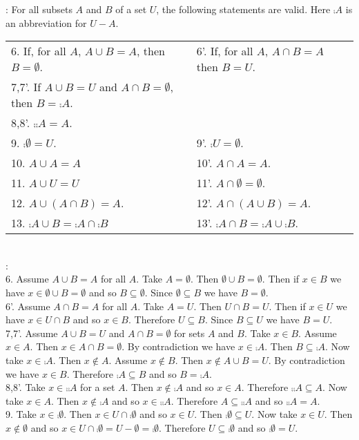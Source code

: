\documentclass[12pt]{book}
\begin{document}
: For all subsets $A$ and $B$ of a set $U$, the following statements are valid. Here $\comp{A}$ is an abbreviation for $U - A$.\\
\begin{tabular}{ll}
6. If, for all $A$, $A \cup B = A$, then $B = \emptyset$.& 6'. If, for all $A$, $A \cap B = A$ then $B = U$.\\
7,7'. If $A \cup B = U$ and $A \cap B = \emptyset$, then $B = \comp{A}$.\\
8,8'. $\comp{\comp{A}} = A$.\\
9. $\comp{\emptyset} = U$.& 9'. $\comp{U} = \emptyset$.\\
10. $A \cup A = A$& 10'. $A \cap A = A$.\\
11. $A \cup U = U$& 11'. $A \cap \emptyset = \emptyset$.\\
12. $A \cup (A \cap B) = A$. &12'. $A \cap (A \cup B) = A$.\\
13. $\comp{A \cup B} = \comp{A} \cap \comp{B}$& 13'. $\comp{A \cap B} = \comp{A} \cup \comp{B}$.
\end{tabular}\\
:\\
6. Assume $A \cup B = A$ for all $A$. Take $A = \emptyset$. Then $\emptyset \cup B = \emptyset$. Then if $x \in B$ we have $x \in \emptyset \cup B = \emptyset$ and so $B \subseteq \emptyset$. Since $\emptyset \subseteq B$ we have $B = \emptyset$.\\
6'. Assume $A \cap B = A$ for all $A$. Take $A = U$. Then $U \cap B = U$. Then if $x \in U$ we have $x \in U \cap B$ and so $x \in B$. Therefore $U \subseteq B$. Since $B \subseteq U$ we have $B = U$.\\
7,7'. Assume $A \cup  B = U$ and $A \cap B = \emptyset$ for sets $A$ and $B$. Take $x \in B$. Assume $x \in A$. Then $x \in A \cap B = \emptyset$. By contradiction we have $x \in \comp{A}$. Then $B \subseteq \comp{A}$. Now take $x \in \comp{A}$. Then $x \notin A$. Assume $x \notin B$. Then $x \notin A \cup B = U$. By contradiction we have $x \in B$. Therefore $\comp{A} \subseteq B$ and so $B = \comp{A}$.\\
8,8'. Take $x \in \comp{\comp{A}}$ for a set $A$. Then $x \notin \comp{A}$ and so $x \in A$. Therefore $\comp{\comp{A}} \subseteq A$. Now take $x \in A$. Then $x \notin \comp{A}$ and so $x \in \comp{\comp{A}}$. Therefore $A \subseteq \comp{\comp{A}}$ and so $\comp{\comp{A}} = A$.\\
9. Take $x \in \comp{\emptyset}$. Then $x \in U \cap \comp{\emptyset}$ and so $x \in U$. Then $\comp{\emptyset} \subseteq U$. Now take $x \in U$. Then $x \notin \emptyset$ and so $x \in U \cap \comp{\emptyset} = U - \emptyset = \comp{\emptyset}$. Therefore $U \subseteq \comp{\emptyset}$ and so $\comp{\emptyset} = U$.\\
\end{document}
